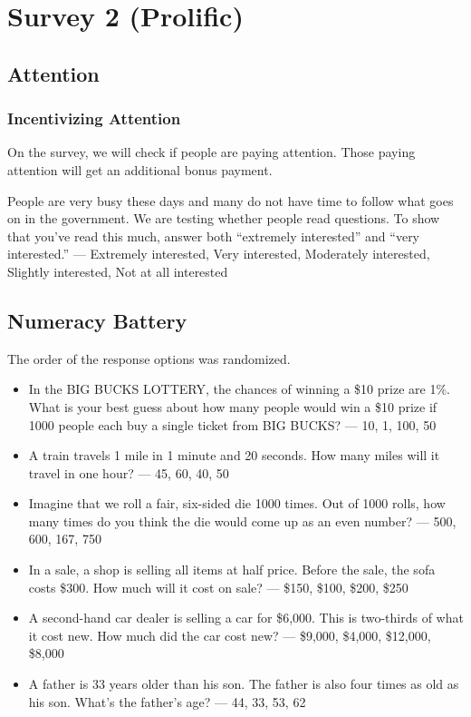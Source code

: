 \documentclass[12pt, letterpaper]{article}
\begin{document}
\section{Survey 2 (Prolific)}

\subsection{Attention}

\subsubsection{Incentivizing Attention}
On the survey, we will check if people are paying attention. Those paying attention will get an additional bonus payment.

People are very busy these days and many do not have time to follow what goes on in the government. We are testing whether people read questions. To show that you've read this much, answer both ``extremely interested'' and ``very interested.'' --- Extremely interested, Very interested,  Moderately interested, Slightly interested, Not at all interested

\subsection{Numeracy Battery}

The order of the response options was randomized.

\begin{itemize}
    \item In the BIG BUCKS LOTTERY, the chances of winning a \$10 prize are 1\%. What is your best guess about how many people would win a \$10 prize if 1000 people each buy a single ticket from BIG BUCKS? — 10, 1, 100, 50
    
    \item A train travels 1 mile in 1 minute and 20 seconds. How many miles will it travel in one hour? — 45, 60, 40, 50
    
    \item Imagine that we roll a fair, six-sided die 1000 times. Out of 1000 rolls, how many times do you think the die would come up as an even number? — 500, 600, 167, 750
    
    \item In a sale, a shop is selling all items at half price. Before the sale, the sofa costs \$300. How much will it cost on sale? — \$150, \$100, \$200, \$250
    
    \item A second-hand car dealer is selling a car for \$6,000. This is two-thirds of what it cost new. How much did the car cost new? — \$9,000, \$4,000, \$12,000, \$8,000
    
    \item A father is 33 years older than his son. The father is also four times as old as his son. What's the father’s age? — 44, 33, 53, 62
\end{itemize}
\end{document}
